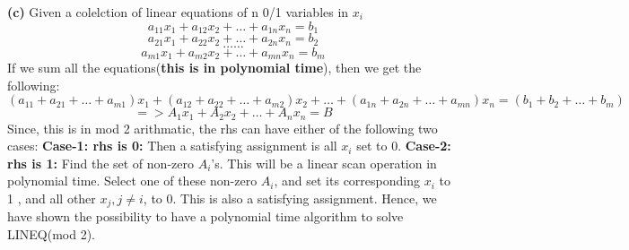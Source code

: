 \documentclass{article}
\renewcommand\part[1]{\vspace{.10in}\textbf{(#1)}}
\begin{document}
\part{c}
Given a colelction of linear equations of n 0/1 variables in $x_{i}$
\[ a_{11}x_{1} + a_{12}x_{2} + \dots + a_{1n}x_{n} = b_{1} \]
\[ a_{21}x_{1} + a_{22}x_{2} + \dots + a_{2n}x_{n} = b_{2} \]
\[ \dots \dots \]
\[ a_{m1}x_{1} + a_{m2}x_{2} + \dots + a_{mn}x_{n} = b_{m} \]
If we sum all the equations(\textbf {this is in polynomial time}), then we get the following: 
\[ (a_{11} + a_{21} + \dots + a_{m1})x_{1} + (a_{12} + a_{22} + \dots + a_{m2})x_{2} + \dots + (a_{1n} + a_{2n} + \dots + a_{mn})x_{n} = (b_{1} + b_{2} + \dots + b_{m})\]
\begin{equation}
 => A_{1}x_{1} + A_{2}x_{2} + \dots + A_{n}x_{n} = B
\end{equation}
Since, this is in mod 2 arithmatic, the rhs can have either of the following two cases: \newline
\hspace*{0.5cm} \textbf {Case-1: rhs is 0: } Then a satisfying assignment is all $x_{i}$ set to 0. \newline
\hspace*{0.5cm} \textbf {Case-2: rhs is 1: } Find the set of non-zero $A_{i}$'s. This will be a linear scan operation in polynomial time. Select one of these non-zero $A_{i}$, and set its corresponding $x_{i}$ to 1 , and all other $x_{j},j \neq i$, to 0. This is also a satisfying assignment. \newline
Hence, we have shown the possibility to have a polynomial time algorithm to solve LINEQ(mod 2). \newline
\end{document}
